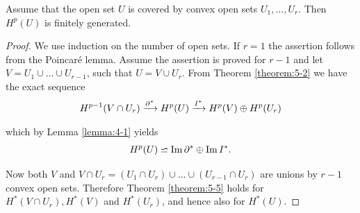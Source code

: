 \begin{theorem}\label{theorem:5-5}
  Assume that the open set $U$ is covered by convex open sets $U_1, \ldots, U_r$. Then $H^p(U)$ is finitely generated.
\end{theorem}

\begin{proof}
  We use induction on the number of open sets. If $r = 1$ the assertion
follows from the Poincar\'e lemma. Assume the assertion is proved for $r - 1$ and
let $V = U_1\cup\ldots\cup U_{r-1}$, such that $U = V\cup U_r$. From Theorem \ref{theorem:5-2} we have 
the exact sequence
\begin{align*}
  H^{p-1}(V\cap U_r) \xra[\partial^*] H^p(U) \xra[I^*] H^p(V)\oplus H^p(U_r)
\end{align*}

which by Lemma \ref{lemma:4-1} yields
\begin{align*}
  H^p(U) \backsimeq \operatorname{Im}\partial^* \oplus \operatorname{Im} I^*.
\end{align*}

Now both $V$ and $V\cap U_r = (U_1\cap U_r)\cup\ldots\cup (U_{r-1}\cap U_r)$ are unions by $r-1$ convex open sets.
Therefore Theorem \ref{theorem:5-5} holds for $H^*(V\cap U_r), H^*(V)$ and $H^*(U_r)$, and hence also for $H^*(U)$.
\end{proof}

